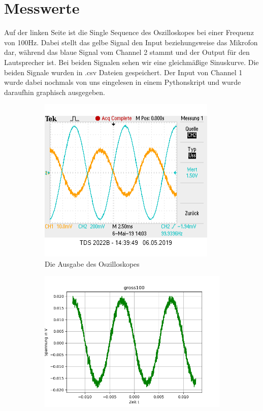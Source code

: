 \documentclass[12pt, oneside, a4paper, \docLanguage]{report}
\begin{document}
\section{Messwerte}
\label{chap:VERSUCH_2_MESSWERTE}
Auf der linken Seite ist die Single Sequence des Oszilloskopes bei einer Frequenz von 100Hz. Dabei stellt das gelbe Signal den Input beziehungsweise das Mikrofon dar, während das blaue Signal vom Channel 2 stammt und der Output für den Lautsprecher ist.
Bei beiden Signalen sehen wir eine gleichmäßige Sinuskurve. Die beiden Signale wurden in .csv Dateien gespeichert. Der Input von Channel 1 wurde dabei nochmals von uns eingelesen in einem Pythonskript und wurde daraufhin graphisch ausgegeben.
\begin{figure}[H]
\centering
\begin{subfigure}{.5\textwidth}
  \centering
  \includegraphics[width=0.9\linewidth]{../data/img/100.png}
  \caption{Die Ausgabe des Oszilloskopes}
  \label{fig:Die Ausgabe des Oszilloskopes}
\end{subfigure}%
\begin{subfigure}{.5\textwidth}
  \centering
  \includegraphics[width=0.9\linewidth]{../data/img/gross100.png}

\end{subfigure}
\end{figure}
\end{document}
